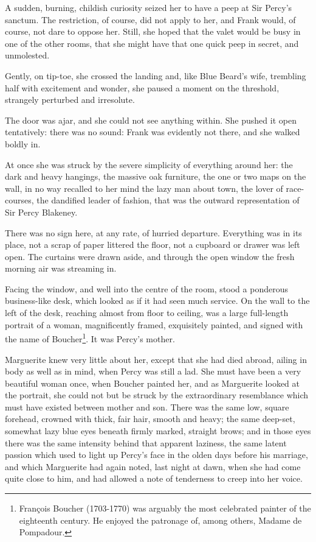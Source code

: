 \documentclass[paper=a5,BCOR=7mm,twoside,DIV=calc,12pt,usegeometry,chapterprefix,endperiod,headings=big]{scrbook}
\begin{document}
A sudden, burning, childish curiosity seized her to have a peep at Sir Percy's sanctum. The restriction, of course, did not apply to her, and Frank would, of course, not dare to oppose her. Still, she hoped that the valet would be busy in one of the other rooms, that she might have that one quick peep in secret, and unmolested.

Gently, on tip-toe, she crossed the landing and, like Blue Beard's wife, trembling half with excitement and wonder, she paused a moment on the threshold, strangely perturbed and irresolute.

The door was ajar, and she could not see anything within. She pushed it open tentatively: there was no sound: Frank was evidently not there, and she walked boldly in.

At once she was struck by the severe simplicity of everything around her: the dark and heavy hangings, the massive oak furniture, the one or two maps on the wall, in no way recalled to her mind the lazy man about town, the lover of race-courses, the dandified leader of fashion, that was the outward representation of Sir Percy Blakeney.

There was no sign here, at any rate, of hurried departure. Everything was in its place, not a scrap of paper littered the floor, not a cupboard or drawer was left open. The curtains were drawn aside, and through the open window the fresh morning air was streaming in.

Facing the window, and well into the centre of the room, stood a ponderous business-like desk, which looked as if it had seen much service. On the wall to the left of the desk, reaching almost from floor to ceiling, was a large full-length portrait of a woman, magnificently framed, exquisitely painted, and signed with the name of Boucher\footnote{François Boucher (1703-1770) was arguably the most celebrated painter of the eighteenth century. He enjoyed the patronage of, among others, Madame de Pompadour.}. It was Percy's mother.

Marguerite knew very little about her, except that she had died abroad, ailing in body as well as in mind, when Percy was still a lad. She must have been a very beautiful woman once, when Boucher painted her, and as Marguerite looked at the portrait, she could not but be struck by the extraordinary resemblance which must have existed between mother and son. There was the same low, square forehead, crowned with thick, fair hair, smooth and heavy; the same deep-set, somewhat lazy blue eyes beneath firmly marked, straight brows; and in those eyes there was the same intensity behind that apparent laziness, the same latent passion which used to light up Percy's face in the olden days before his marriage, and which Marguerite had again noted, last night at dawn, when she had come quite close to him, and had allowed a note of tenderness to creep into her voice.
\end{document}
